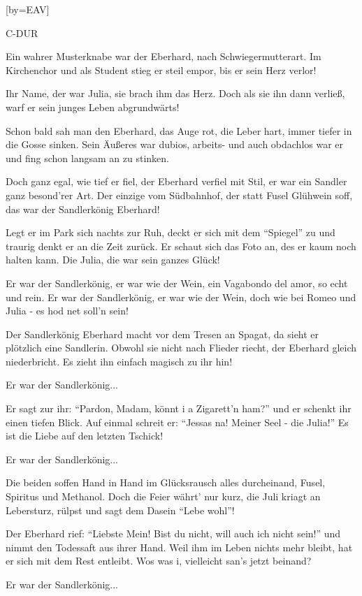 
[by={EAV}]

\chordsoff

\beginverse
\nolyrics C-DUR
\endverse


\beginverse
Ein wahrer Musterknabe war der Eberhard,
nach Schwiegermutterart.
Im Kirchenchor und als Student stieg er steil empor,
bis er sein Herz verlor!

Ihr Name, der war Julia, sie brach ihm das Herz.
Doch als sie ihn dann verließ, warf er sein junges Leben abgrundwärts!
\endverse


\beginverse
Schon bald sah man den Eberhard,
das Auge rot, die Leber hart,
immer tiefer in die Gosse sinken.
Sein Äußeres war dubios,
arbeits- und auch obdachlos
war er und fing schon langsam an zu stinken.
\endverse


\beginverse
Doch ganz egal, wie tief er fiel,
der Eberhard verfiel mit Stil,
er war ein Sandler ganz besond'rer Art.
Der einzige vom Südbahnhof,
der statt Fusel Glühwein soff,
das war der Sandlerkönig Eberhard!
\endverse

\beginverse
Legt er im Park sich nachts zur Ruh,
deckt er sich mit dem ``Spiegel'' zu
und traurig denkt er an die Zeit zurück.
Er schaut sich das Foto an,
des er kaum noch halten kann.
Die Julia, die war sein ganzes Glück!
\endverse


\beginchorus
Er war der Sandlerkönig, er war wie der Wein,
ein Vagabondo del amor, so echt und rein.
Er war der Sandlerkönig, er war wie der Wein,
doch wie bei Romeo und Julia - es hod net soll'n sein!
\endchorus

\beginverse
Der Sandlerkönig Eberhard
macht vor dem Tresen an Spagat,
da sieht er plötzlich eine Sandlerin.
Obwohl sie nicht nach Flieder riecht,
der Eberhard gleich niederbricht.
Es zieht ihn einfach magisch zu ihr hin!
\endverse

\beginchorus
Er war der Sandlerkönig...
\endchorus

\beginverse
Er sagt zur ihr: ``Pardon, Madam,
könnt i a Zigarett'n ham?''
und er schenkt ihr einen tiefen Blick.
Auf einmal schreit er: ``Jessas na!
Meiner Seel - die Julia!''
Es ist die Liebe auf den letzten Tschick!
\endverse


\beginchorus
Er war der Sandlerkönig...
\endchorus


\beginverse
Die beiden soffen Hand in Hand
im Glücksrausch alles durcheinand,
Fusel, Spiritus und Methanol.
Doch die Feier währt' nur kurz,
die Juli kriagt an Lebersturz,
rülpst und sagt dem Dasein ``Lebe wohl''!
\endverse

\beginverse
Der Eberhard rief: ``Liebste Mein!
Bist du nicht, will auch ich nicht sein!''
und nimmt den Todessaft aus ihrer Hand.
Weil ihm im Leben nichts mehr bleibt,
hat er sich mit dem Rest entleibt.
Wos was i, vielleicht san's jetzt beinand?
\endverse

\beginchorus
Er war der Sandlerkönig...
\endchorus

\endsong